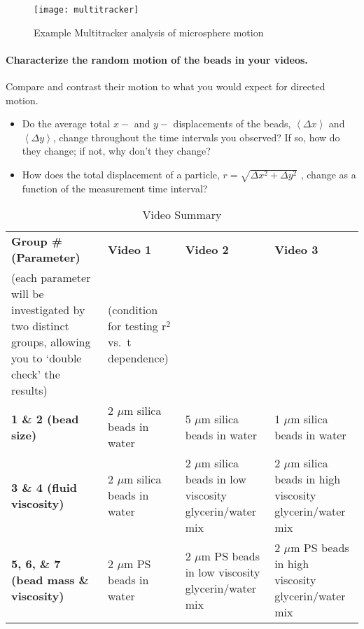 \begin{figure}[ht]
	\centering
	\texttt{[image: multitracker]}
	\caption{Example Multitracker analysis of microsphere motion}
	\label{fig:multitracker}
\end{figure}

\paragraph*{Characterize the random motion of the beads in your videos.} Compare and contrast their motion to what you would expect for directed motion.
\begin{itemize}
\item Do the average total $x-$ and $y-$ displacements of the beads, $\left \langle \Delta x \right \rangle$ and $\left \langle \Delta y \right \rangle$, change throughout the time intervals you observed? If so, how do they change; if not, why don't they change?
\item How does the total displacement of a particle, $r=\sqrt{\Delta x^2+\Delta y^2}$ , change as a function of the measurement time interval?
\end{itemize}

\begin{table}[ht]
\centering
\begin{tabular}{|p{4.5cm}|p{3cm}|p{3cm}|p{3cm}|}
\hline
 \textbf{Group \# (Parameter)} & \textbf{Video 1} & \textbf{Video 2} & \textbf{Video 3}  \\
 (each parameter will be investigated by two distinct groups, allowing you to `double check' the results) & (condition for testing r$^2$ vs.\ t dependence) &  & \\ \hline
 \textbf{1 \& 2 (bead size)} & 2 $\mu$m silica beads in water & 5 $\mu$m silica beads in water & 1 $\mu$m silica beads in water \\ \hline
 \textbf{3 \& 4 (fluid viscosity)} & 2 $\mu$m silica beads in water & 2 $\mu$m silica beads in low viscosity glycerin/water mix & 2 $\mu$m silica beads in high viscosity glycerin/water mix \\ \hline
 \textbf{5, 6, \& 7 (bead mass \& viscosity)} & 2 $\mu$m PS beads in water & 2 $\mu$m PS beads in low viscosity glycerin/water mix & 2 $\mu$m PS beads in high viscosity glycerin/water mix \\ \hline
\end{tabular}
\caption{Video Summary}
\label{tab:exp3video}
\end{table}

